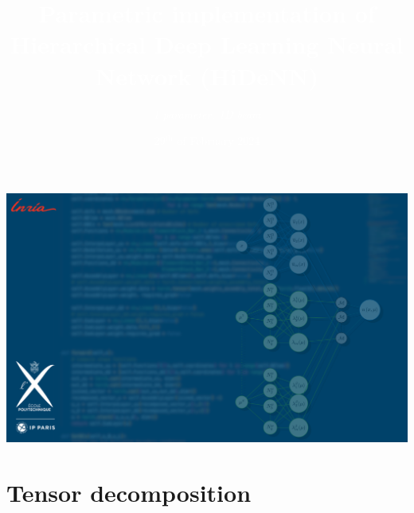 \documentclass[aspectratio=1610]{beamer}
\title[] %
{\bfseries \textcolor{white}{Parametric implementation of Hierarchical Deep Learning Neural Network (HiDeNN)}
}
\subtitle{\itshape\textcolor{white}{ 1 parameter, 1D beam }}
\date[VLC 2023] %
{\textcolor{white}{29$^{\text{th}}$ of February 2024}}
\begin{document}
	
	{
		{	\hspace*{\sidebarwidth}
			\hspace{-1.9cm}
			
			\includegraphics[width=1.121\imagewidth]{Logos/LMS/TitlePage.png}
		}
		
		\frame[plain]{\titlepage} 
	}
	
	
	
	
	
	\section{Tensor decomposition}
	
\end{document}
